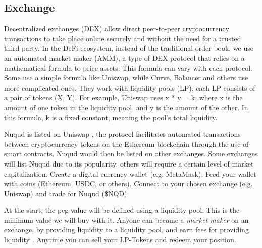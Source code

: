 \documentclass[12pt]{article}
\begin{document}
\subsection{Exchange}
Decentralized exchanges (DEX) allow direct peer-to-peer cryptocurrency transactions to take place online securely and without the need for a trusted third party. In the DeFi ecosystem, instead of the traditional order book, we use an automated market maker (AMM), a type of DEX protocol that relies on a mathematical formula to price assets. This formula can vary with each protocol. Some use a simple formula like Uniswap, while Curve, Balancer and others use more complicated ones. They work with liquidity pools (LP), each LP consists of a pair of tokens (X, Y).  For example, Uniswap uses x * y = k, where x is the amount of one token in the liquidity pool, and y is the amount of the other. In this formula, k is a fixed constant, meaning the pool’s total liquidity.

Nuqud is listed on Uniswap \cite{uniswap2020protocol}, the protocol facilitates automated transactions between cryptocurrency tokens on the Ethereum blockchain through the use of smart contracts. Nuqud would then be listed on other exchanges. Some exchanges will list Nuqud due to its popularity, others will require a certain level of market capitalization. Create a digital currency wallet (e.g. MetaMask). Feed your wallet with coins (Ethereum, USDC, or others). Connect to your chosen exchange (e.g. Uniswap) and trade for Nuqud (\$NQD).

At the start, the peg-value will be defined using a liquidity pool. This is the minimum value we will buy with it. Anyone can become a \emph{market maker} on an exchange, by providing liquidity to a liquidity pool, and earn fees for providing liquidity \cite{liquidity2021pools}. Anytime you can sell your LP-Tokens and redeem your position.
\end{document}
